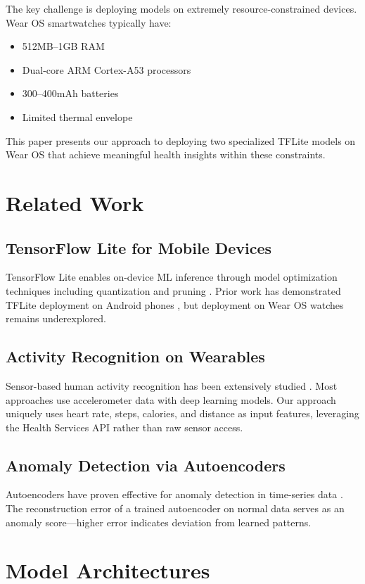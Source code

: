 \documentclass[conference]{IEEEtran}
\begin{document}
The key challenge is deploying models on extremely resource-constrained devices. Wear OS smartwatches typically have:
\begin{itemize}
    \item 512MB--1GB RAM
    \item Dual-core ARM Cortex-A53 processors
    \item 300--400mAh batteries
    \item Limited thermal envelope
\end{itemize}

This paper presents our approach to deploying two specialized TFLite models on Wear OS that achieve meaningful health insights within these constraints.

\section{Related Work}
\subsection{TensorFlow Lite for Mobile Devices}
TensorFlow Lite enables on-device ML inference through model optimization techniques including quantization and pruning \cite{tflite}. Prior work has demonstrated TFLite deployment on Android phones \cite{mobile_ml1}, but deployment on Wear OS watches remains underexplored.

\subsection{Activity Recognition on Wearables}
Sensor-based human activity recognition has been extensively studied \cite{har1, har2}. Most approaches use accelerometer data with deep learning models. Our approach uniquely uses heart rate, steps, calories, and distance as input features, leveraging the Health Services API rather than raw sensor access.

\subsection{Anomaly Detection via Autoencoders}
Autoencoders have proven effective for anomaly detection in time-series data \cite{autoencoder1}. The reconstruction error of a trained autoencoder on normal data serves as an anomaly score---higher error indicates deviation from learned patterns.

\section{Model Architectures}
\end{document}
